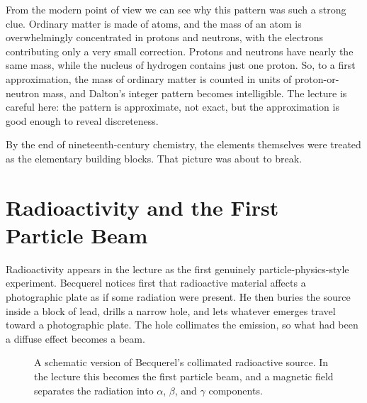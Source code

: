 From the modern point of view we can see why this pattern was such a strong clue. Ordinary matter is made of atoms, and the mass of an atom is overwhelmingly concentrated in protons and neutrons, with the electrons contributing only a very small correction. Protons and neutrons have nearly the same mass, while the nucleus of hydrogen contains just one proton. So, to a first approximation, the mass of ordinary matter is counted in units of proton-or-neutron mass, and Dalton's integer pattern becomes intelligible. The lecture is careful here: the pattern is approximate, not exact, but the approximation is good enough to reveal discreteness.

By the end of nineteenth-century chemistry, the elements themselves were treated as the elementary building blocks. That picture was about to break.

\section{Radioactivity and the First Particle Beam}

Radioactivity appears in the lecture as the first genuinely particle-physics-style experiment. Becquerel notices first that radioactive material affects a photographic plate as if some radiation were present. He then buries the source inside a block of lead, drills a narrow hole, and lets whatever emerges travel toward a photographic plate. The hole collimates the emission, so what had been a diffuse effect becomes a beam.

\begin{figure}[h]
\centering
{}
\caption{A schematic version of Becquerel's collimated radioactive source. In the lecture this becomes the first particle beam, and a magnetic field separates the radiation into \(\alpha\), \(\beta\), and \(\gamma\) components.}
\end{figure}

